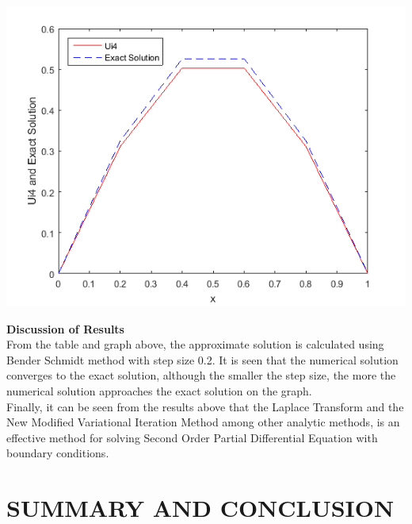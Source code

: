 \documentclass[12pt]{report}
\begin{document}
\begin{center}
	\noindent \includegraphics[width=1.1\linewidth]{graph_f}
\end{center}
\textbf{Discussion of Results}\\
From the table and graph above, the approximate solution is calculated using Bender Schmidt method with step size 0.2. It is seen that the numerical solution converges to the exact solution, although the smaller the step size, the more the numerical solution approaches the exact solution on the graph.\\

\noindent Finally, it can be seen from the results above that the Laplace Transform and the New Modified Variational Iteration Method among other analytic methods, is an effective method for solving Second Order Partial Differential Equation with boundary conditions. 



\chapter{SUMMARY AND CONCLUSION}
\end{document}
